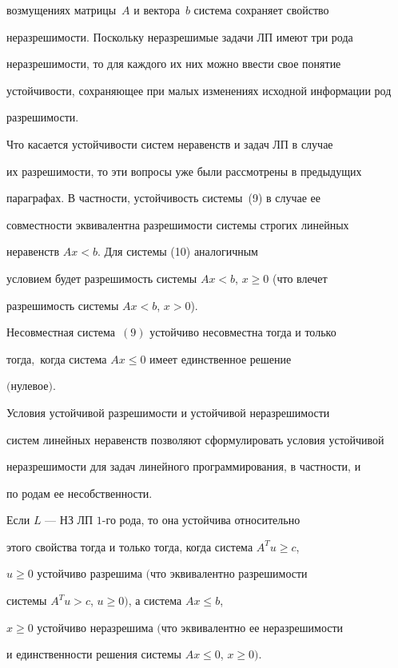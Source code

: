 возмущениях матрицы~$A$ и вектора~$b$ система сохраняет свойство


неразрешимости. Поскольку неразрешимые задачи ЛП имеют три рода


неразрешимости, то для каждого их них можно ввести свое понятие


устойчивости, сохраняющее при малых изменениях исходной информации род


разрешимости.





Что касается устойчивости систем неравенств и задач ЛП в случае


их разрешимости, то эти вопросы уже были рассмотрены в предыдущих


параграфах. В частности, устойчивость системы~(9) в случае ее


совместности эквивалентна разрешимости системы строгих линейных


неравенств $Ax<b$. Для системы (10) аналогичным


условием будет разрешимость системы $Ax<b$, $x\geq 0$ (что влечет


разрешимость системы $Ax<b$, $x>0$).





\begin{thm}


Несовместная система~$(9)$ устойчиво несовместна тогда и только


тогда,\ когда система $Ax\leq 0$ имеет единственное решение


$($нулевое$)$.


\end{thm}





Условия устойчивой разрешимости и устойчивой неразрешимости


систем линейных неравенств позволяют сформулировать условия устойчивой


неразрешимости для задач линейного программирования, в частности, и


по родам ее несобственности.





\begin{thm}


Если $L$ --- НЗ ЛП\; $1$-го рода, то она устойчива относительно


этого свойства тогда и только тогда, когда система $A^Tu\geq c$,


$u\geq 0$ устойчиво разрешима $($что эквивалентно разрешимости


системы $A^Tu>c$, $u\geq 0)$, а система $Ax\leq b$,


$x\geq 0$ устойчиво неразрешима $($что эквивалентно ее неразрешимости


и единственности решения системы $Ax\leq 0$, $x\geq 0)$.


\end{thm}





